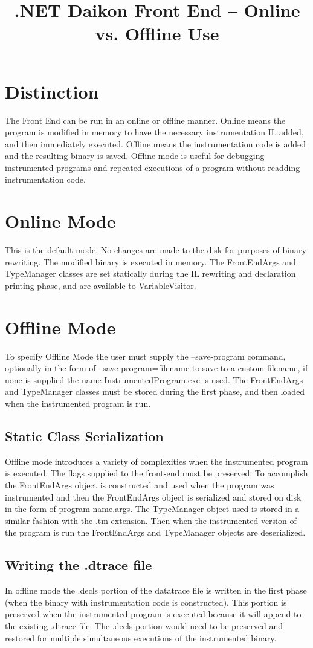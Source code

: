\documentclass{article}
\title{.NET Daikon Front End -- Online vs. Offline Use}
\begin{document}
\maketitle

\section{Distinction}
The Front End can be run in an online or offline manner. Online means the program is modified in memory to have the necessary instrumentation IL added, and then immediately executed. Offline means the instrumentation code is added and the resulting binary is saved. Offline mode is useful for debugging instrumented programs and repeated executions of a program without readding instrumentation code.

\section{Online Mode}
This is the default mode. No changes are made to the disk for purposes of binary rewriting. The modified binary is executed in memory. The FrontEndArgs and TypeManager classes are set statically during the IL rewriting and declaration printing phase, and are available to VariableVisitor.

\section{Offline Mode}
To specify Offline Mode the user must supply the --save-program command, optionally in the form of --save-program=filename to save to a custom filename, if none is supplied the name InstrumentedProgram.exe is used. The FrontEndArgs and TypeManager classes must be stored during the first phase, and then loaded when the instrumented program is run.

\subsection{Static Class Serialization}
Offline mode introduces a variety of complexities when the instrumented program is executed. The flags supplied to the front-end must be preserved. To accomplish the FrontEndArgs object is constructed and used when the program was instrumented and then the FrontEndArgs object is serialized and stored on disk in the form of {program name}.args. The TypeManager object used is stored in a similar fashion with the .tm extension. Then when the instrumented version of the program is run the FrontEndArgs and TypeManager objects are deserialized.

\subsection{Writing the .dtrace file}
In offline mode the .decls portion of the datatrace file is written in the first phase (when the binary with instrumentation code is constructed). This portion is preserved when the instrumented program is executed because it will append to the existing .dtrace file. The .decls portion would need to be preserved and restored for multiple simultaneous executions of the instrumented binary.
\end{document}
